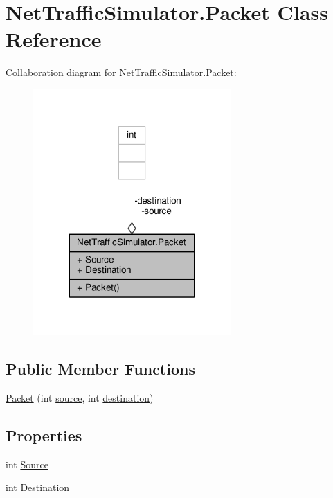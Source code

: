 \hypertarget{classNetTrafficSimulator_1_1Packet}{\section{Net\-Traffic\-Simulator.\-Packet Class Reference}
\label{classNetTrafficSimulator_1_1Packet}
}


Collaboration diagram for Net\-Traffic\-Simulator.\-Packet\-:\nopagebreak
\begin{figure}[H]
\begin{center}
\leavevmode
\includegraphics[width=214pt]{classNetTrafficSimulator_1_1Packet__coll__graph}
\end{center}
\end{figure}
\subsection*{Public Member Functions}
\begin{DoxyCompactItemize}
\item 
\hyperlink{classNetTrafficSimulator_1_1Packet_a7f873b329bd79faac2022a2ca4f77ed9}{Packet} (int \hyperlink{classNetTrafficSimulator_1_1Packet_a14e22dc3d532950074fe557df6b05324}{source}, int \hyperlink{classNetTrafficSimulator_1_1Packet_abb858df4db6996ea17200fb0369a7b2c}{destination})
\end{DoxyCompactItemize}
\subsection*{Properties}
\begin{DoxyCompactItemize}
\item 
int \hyperlink{classNetTrafficSimulator_1_1Packet_aa1bbb33d4ac2bab95590f51831d9cff8}{Source}
\item 
int \hyperlink{classNetTrafficSimulator_1_1Packet_a4b9f5194a86e8ede7235533e5562f3cc}{Destination}
\end{DoxyCompactItemize}
